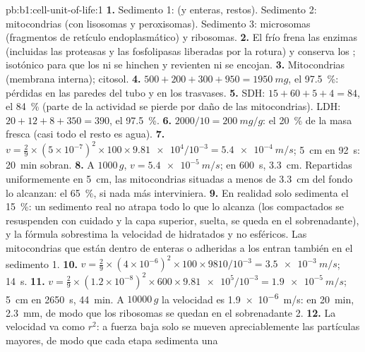 \begin{solution}{pb:b1:cell-unit-of-life:1}
\textbf{1.} Sedimento 1:  (y  enteras, restos). Sedimento 2:
mitocondrias (con lisosomas y peroxisomas). Sedimento 3: microsomas
(fragmentos de retículo endoplasmático) y ribosomas.
\textbf{2.} El frío frena las enzimas (incluidas las proteasas y las
fosfolipasas liberadas por la rotura) y conserva los ; isotónico
para que los  ni se hinchen y revienten ni se encojan.
\textbf{3.} Mitocondrias (membrana interna); citosol.
\textbf{4.} $500 + 200 + 300 + 950 = \qty{1950}{mg}$, el \qty{97.5}{\%}:
pérdidas en las paredes del tubo y en los trasvases.
\textbf{5.} SDH: $15 + 60 + 5 + 4 = 84$, el \qty{84}{\%} (parte de la
actividad se pierde por daño de las mitocondrias). LDH:
$20 + 12 + 8 + 350 = 390$, el \qty{97.5}{\%}.
\textbf{6.} $2000/10 = \qty{200}{mg/g}$: el \qty{20}{\%} de la masa fresca (casi todo el resto es agua).
\textbf{7.} $v = \frac{2}{9}\times(5\times 10^{-7})^2\times 100\times
\num{9.81e4}/10^{-3} = \qty{5.4e-4}{m/s}$; \qty{5}{cm} en \qty{92}{s}:
\qty{20}{min} sobran.
\textbf{8.} A $1000\,g$, $v = \qty{5.4e-5}{m/s}$; en \qty{600}{s},
\qty{3.3}{cm}. Repartidas uniformemente en \qty{5}{cm}, las mitocondrias
situadas a menos de \qty{3.3}{cm} del fondo lo alcanzan: el \qty{65}{\%}, si
nada más interviniera.
\textbf{9.} En realidad solo sedimenta el \qty{15}{\%}: un sedimento real no
atrapa todo lo que lo alcanza (los  compactados se resuspenden con
cuidado y la capa superior, suelta, se queda en el sobrenadante), y la
fórmula sobrestima la velocidad de  hidratados y no esféricos. Las
mitocondrias que están dentro de  enteras o adheridas a los 
entran también en el sedimento 1.
\textbf{10.} $v = \frac{2}{9}\times(4\times 10^{-6})^2\times 100\times
9810/10^{-3} = \qty{3.5e-3}{m/s}$; \qty{14}{s}.
\textbf{11.} $v = \frac{2}{9}\times(1.2\times 10^{-8})^2\times 600\times
\num{9.81e5}/10^{-3} = \qty{1.9e-5}{m/s}$; \qty{5}{cm} en \qty{2650}{s},
\qty{44}{min}. A $\num{10000}\,g$ la velocidad es \qty{1.9e-6}{m/s}: en
\qty{20}{min}, \qty{2.3}{mm}, de modo que los ribosomas se quedan en el
sobrenadante 2.
\textbf{12.} La velocidad va como $r^2$: a fuerza baja solo se mueven
apreciablemente las partículas mayores, de modo que cada etapa sedimenta una

\end{solution}
